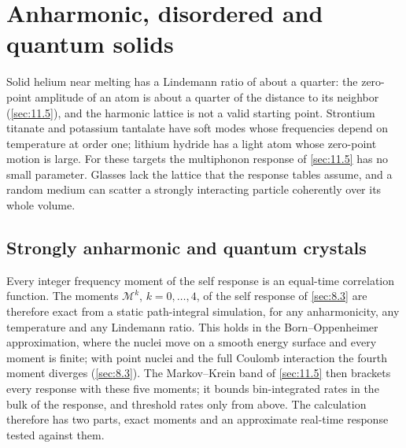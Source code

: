 \section{Anharmonic, disordered and quantum solids}\label{app:E.19}

Solid helium near melting has a Lindemann ratio of about a quarter: the zero-point amplitude of an atom is about a quarter of the distance to its neighbor (\cref{sec:11.5}), and the harmonic lattice is not a valid starting point. Strontium titanate and potassium tantalate have soft modes whose frequencies depend on temperature at order one; lithium hydride has a light atom whose zero-point motion is large. For these targets the multiphonon response of \cref{sec:11.5} has no small parameter. Glasses lack the lattice that the response tables assume, and a random medium can scatter a strongly interacting particle coherently over its whole volume.

\subsection{Strongly anharmonic and quantum crystals}

Every integer frequency moment of the self response is an equal-time correlation function. The moments $\mathscr{M}^k$, $k = 0,\dots,4$, of the self response of \cref{sec:8.3} are therefore exact from a static path-integral simulation, for any anharmonicity, any temperature and any Lindemann ratio. This holds in the Born--Oppenheimer approximation, where the nuclei move on a smooth energy surface and every moment is finite; with point nuclei and the full Coulomb interaction the fourth moment diverges (\cref{sec:8.3}). The Markov--Krein band of \cref{sec:11.5} then brackets every response with these five moments; it bounds bin-integrated rates in the bulk of the response, and threshold rates only from above. The calculation therefore has two parts, exact moments and an approximate real-time response tested against them.

